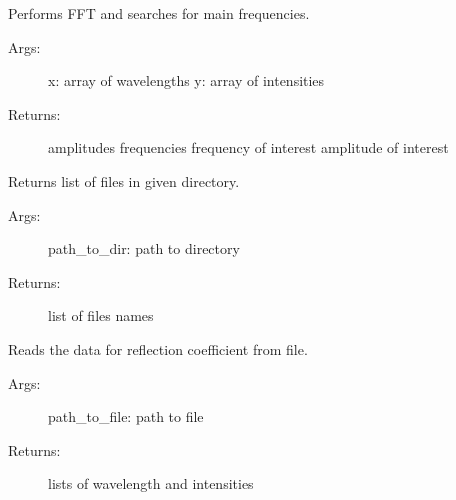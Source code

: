 \documentclass[letterpaper,10pt,english]{sphinxmanual}
\begin{document}

\begin{fulllineitems}
\label{\detokenize{GUI:GUI.fourier_analysis}}
Performs FFT and searches for main frequencies.
\begin{description}
\item[{Args:}] \leavevmode
x: array of wavelengths
y: array of intensities

\item[{Returns:}] \leavevmode
amplitudes 
frequencies
frequency of interest
amplitude of interest

\end{description}

\end{fulllineitems}


\begin{fulllineitems}
\label{\detokenize{GUI:GUI.get_files_list}}
Returns list of files in given directory.
\begin{description}
\item[{Args:}] \leavevmode
path\_to\_dir: path to directory

\item[{Returns:}] \leavevmode
list of files names

\end{description}

\end{fulllineitems}


\begin{fulllineitems}
\label{\detokenize{GUI:GUI.refection_coef_read}}
Reads the data for reflection coefficient from file.
\begin{description}
\item[{Args:}] \leavevmode
path\_to\_file: path to file

\item[{Returns:}] \leavevmode
lists of wavelength and intensities

\end{description}

\end{fulllineitems}
\end{document}
